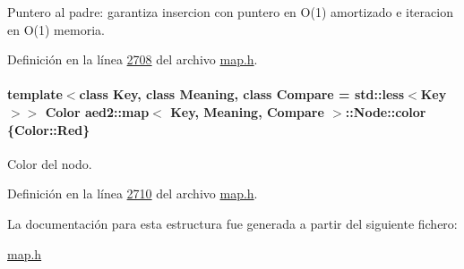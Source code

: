 Puntero al padre\-: garantiza insercion con puntero en O(1) amortizado e iteracion en O(1) memoria. 



Definición en la línea \hyperlink{map_8h_source_l02708}{2708} del archivo \hyperlink{map_8h_source}{map.\-h}.

\hypertarget{structaed2_1_1map_1_1Node_a58dd9993fee8ee3eaa5716b72a3eca47_a58dd9993fee8ee3eaa5716b72a3eca47}{
\paragraph[{color}]{\setlength{\rightskip}{0pt plus 5cm}template$<$class Key, class Meaning, class Compare = std\-::less$<$\-Key$>$$>$ {\bf Color} {\bf aed2\-::map}$<$ Key, Meaning, Compare $>$\-::Node\-::color \{Color\-::\-Red\}}}\label{structaed2_1_1map_1_1Node_a58dd9993fee8ee3eaa5716b72a3eca47_a58dd9993fee8ee3eaa5716b72a3eca47}


Color del nodo. 



Definición en la línea \hyperlink{map_8h_source_l02710}{2710} del archivo \hyperlink{map_8h_source}{map.\-h}.



La documentación para esta estructura fue generada a partir del siguiente fichero\-:\begin{DoxyCompactItemize}
\item 
\hyperlink{map_8h}{map.\-h}\end{DoxyCompactItemize}

